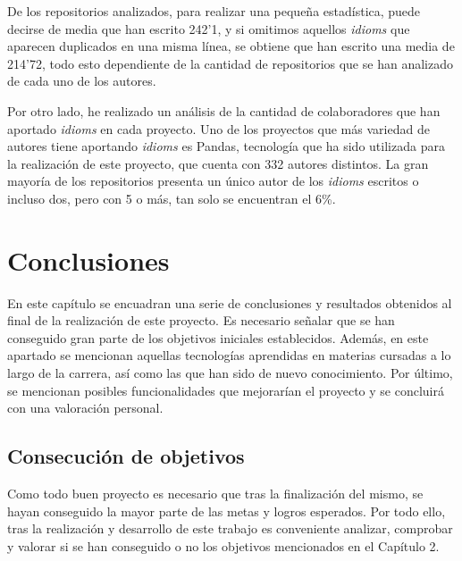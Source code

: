 \documentclass[a4paper, 12pt]{book}
\begin{document}
De los repositorios analizados, para realizar una pequeña estadística, puede decirse de media que han escrito 242'1, y si omitimos aquellos \textit{idioms} que aparecen duplicados en una misma línea, se obtiene que han escrito una media de 214'72, todo esto dependiente de la cantidad de repositorios que se han analizado de cada uno de los autores.

Por otro lado, he realizado un análisis de la cantidad de colaboradores que han aportado \textit{idioms} en cada proyecto. Uno de los proyectos que más variedad de autores tiene aportando \textit{idioms} es Pandas, tecnología que ha sido utilizada para la realización de este proyecto, que cuenta con 332 autores distintos. La gran mayoría de los repositorios presenta un único autor de los \textit{idioms} escritos o incluso dos, pero con 5 o más, tan solo se encuentran el 6\%.






\cleardoublepage
\chapter{Conclusiones}
\label{chap:conclusiones}

En este capítulo se encuadran una serie de conclusiones y resultados obtenidos al final de la realización de este proyecto. Es necesario señalar que se han conseguido gran parte de los objetivos iniciales establecidos. Además, en este apartado se mencionan aquellas tecnologías aprendidas en materias cursadas a lo largo de la carrera, así como las que han sido de nuevo conocimiento. Por último, se mencionan posibles funcionalidades que mejorarían el proyecto y se concluirá con una valoración personal.

\section{Consecución de objetivos}
\label{sec:consecucion-objetivos}

Como todo buen proyecto es necesario que tras la finalización del mismo, se hayan conseguido la mayor parte de las metas y logros esperados. Por todo ello, tras la realización y desarrollo de este trabajo es conveniente analizar, comprobar y valorar si se han conseguido o no los objetivos mencionados en el Capítulo 2.
\end{document}
